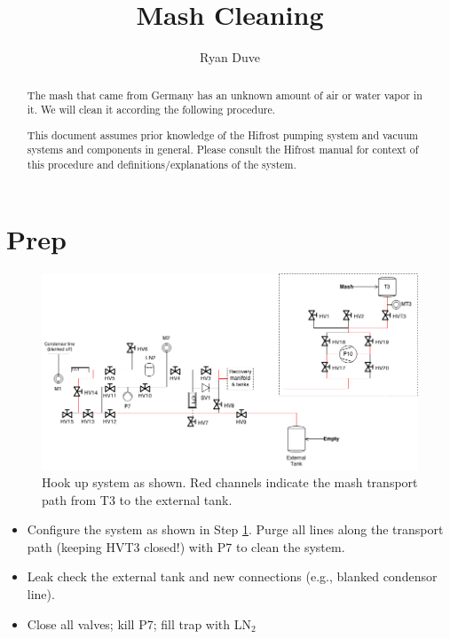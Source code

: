 \documentclass[a4paper,10pt]{article}
\title{Mash Cleaning}
\author{Ryan Duve}
\begin{document}
\maketitle

\begin{abstract}

\vspace{.5cm}


The mash that came from Germany has an unknown amount of air or water vapor in it.  We will clean it according the following procedure.

This document assumes prior knowledge of the Hifrost pumping system and vacuum systems and components in general.  Please consult the Hifrost manual for context of this procedure and definitions/explanations of the system.
\end{abstract}

\section{Prep}
\begin{figure}[htbp!]
 \centering
 \includegraphics[width=\textwidth]{./mash-cleaning-schematic-1.png}
 \caption{Hook up system as shown.  Red channels indicate the mash transport path from T3 to the external tank.}
 \label{a}
\end{figure}

\begin{itemize}
 \item Configure the system as shown in Step \ref{a}. Purge all lines along the transport path (keeping HVT3 closed!) with P7 to clean the system.
 \item Leak check the external tank and new connections (e.g., blanked condensor line).
 \item Close all valves; kill P7; fill trap with LN$_2$
\end{itemize}
\end{document}
